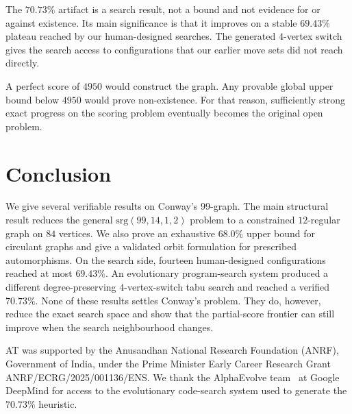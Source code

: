 \documentclass{article}
\begin{document}
The $70.73\%$ artifact is a search result, not a bound and not evidence for or
against existence. Its main significance is that it improves on a stable
$69.43\%$ plateau reached by our human-designed searches. The generated
$4$-vertex switch gives the search access to configurations that our earlier
move sets did not reach directly.

A perfect score of $4950$ would construct the graph. Any provable global upper
bound below $4950$ would prove non-existence. For that reason, sufficiently
strong exact progress on the scoring problem eventually becomes the original
open problem.

\section{Conclusion}
We give several verifiable results on Conway's 99-graph. The main structural result reduces the general
$\mathrm{srg}(99,14,1,2)$ problem to a constrained $12$-regular graph on
$84$ vertices. We also prove an exhaustive $68.0\%$ upper bound for circulant graphs and give a validated orbit formulation for prescribed automorphisms. On the search side, fourteen human-designed configurations reached at most
$69.43\%$. An evolutionary program-search system produced a different
degree-preserving $4$-vertex-switch tabu search and reached a verified
$70.73\%$. None of these results settles Conway's problem. They do, however, reduce the
exact search space and show that the partial-score frontier can still improve
when the search neighbourhood changes.

\begin{ack}
AT was supported by the Anusandhan National Research Foundation (ANRF),
Government of India, under the Prime Minister Early Career Research Grant
ANRF/ECRG/2025/001136/ENS. We thank the AlphaEvolve
team~\cite{alphaevolve} at Google DeepMind for access to the
evolutionary code-search system used to generate the $70.73\%$ heuristic.
\end{ack}
\end{document}
